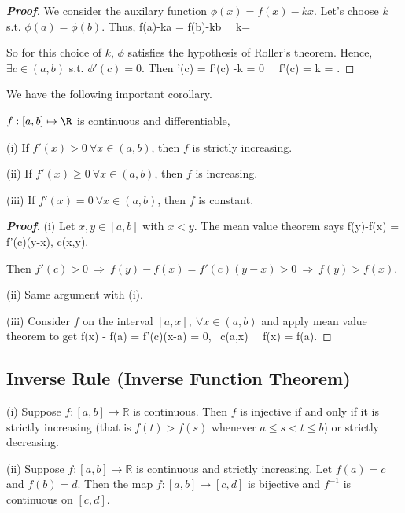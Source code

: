 \begin{proof}[{\bf Proof}]
We consider the auxilary function $\phi(x)=f(x)-kx$. Let's choose $k$ s.t. $\phi(a)=\phi(b)$. Thus,
\be
f(a)-ka = f(b)-kb \ \Rightarrow \ k=
\ee

So for this choice of $k$, $\phi$ satisfies the hypothesis of Roller's theorem. Hence, $\exists c\in (a,b)$ s.t. $\phi'(c)=0$. Then
\be
\phi'(c) = f'(c) -k = 0 \ \Rightarrow \ f'(c) = k = .
\ee
\end{proof}

We have the following important corollary.

\begin{corollary}\label{cor:diff}
$f: [a,b]\mapsto \R$ is continuous and differentiable, 
\ben
\item [(i)] If $f'(x)>0 \ \forall x\in (a,b)$, then $f$ is strictly increasing.
\item [(ii)] If $f'(x)\geq 0 \ \forall x\in (a,b)$, then $f$ is increasing.
\item [(iii)] If $f'(x)=0 \ \forall x\in (a,b)$, then $f$ is constant.
\een
\end{corollary}

\begin{proof}[{\bf Proof}]
\ben
\item [(i)] Let $x,y\in[a,b]$ with $x<y$. The mean value theorem says 
\be
f(y)-f(x) = f'(c)(y-x), \quad \exists c\in (x,y).
\ee

Then $f'(c)>0 \ \Rightarrow \ f(y)-f(x) = f'(c)(y-x) >0 \ \Rightarrow \ f(y) > f(x)$.

\item [(ii)] Same argument with (i).
\item [(iii)] Consider $f$ on the interval $[a,x],\ \forall x\in(a,b)$ and apply mean value theorem to get 
\be
f(x) - f(a) = f'(c)(x-a) = 0, \ \exists c\in (a,x) \ \Rightarrow \ f(x) = f(a).
\ee
\een
\end{proof}


\subsection{Inverse Rule (Inverse Function Theorem)}

\begin{lemma}
\ben
\item [(i)] Suppose $f : [a,b] \rightarrow \mathbb{R}$ is continuous. Then $f$ is injective if and only if it is strictly increasing (that is $f(t) > f(s)$ whenever $a \leq s < t \leq b$) or strictly decreasing.

\item [(ii)] Suppose $f : [a,b] \rightarrow \mathbb{R}$ is continuous and strictly increasing. Let $f(a) = c$ and $f(b) = d$. Then the map $f : [a,b] \rightarrow [c,d]$ is bijective and $f^{-1}$ is continuous on $[c,d]$. 
\een
\end{lemma}

